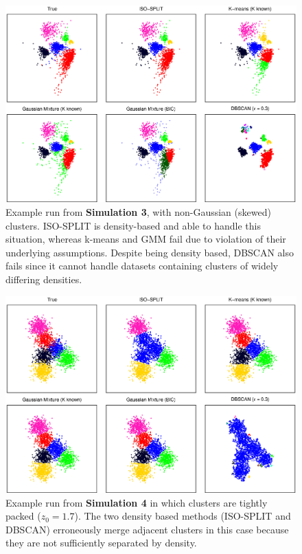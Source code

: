 \documentclass[10pt]{article}
\begin{document}
\begin{figure}
\begin{center}
\includegraphics[width=5.5in]{images/simulation3.eps}
\end{center}
\caption{
Example run from \textbf{Simulation 3}, with non-Gaussian (skewed) clusters. ISO-SPLIT is density-based and able to handle this situation, whereas k-means and GMM fail due to violation of their underlying assumptions. Despite being density based, DBSCAN also fails since it cannot handle datasets containing clusters of widely differing densities.
}
\label{fig:simulation3}
\end{figure}

\begin{figure}
\begin{center}
\includegraphics[width=5.5in]{images/simulation4.eps}
\end{center}
\caption{
Example run from \textbf{Simulation 4} in which clusters are tightly packed ($z_0=1.7$). The two density based methods (ISO-SPLIT and DBSCAN) erroneously merge adjacent clusters in this case because they are not sufficiently separated by density.
}
\label{fig:simulation4}
\end{figure}
\end{document}
